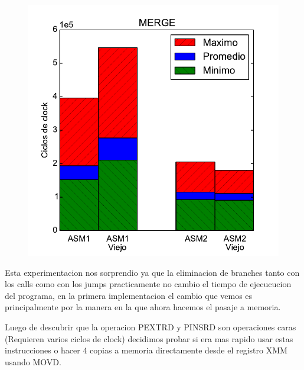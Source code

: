 \begin{figure}[h!]
	\centering
	\includegraphics[scale=0.45]{images/merge_comparationOLD}
\end{figure}

Esta experimentacion nos sorprendio ya que la eliminacion de branches tanto con los calls como con los jumps practicamente no cambio el tiempo de ejecucucion del programa, en la primera implementacion el cambio que vemos es principalmente por la manera en la que ahora hacemos el pasaje a memoria.

Luego de descubrir que la operacion PEXTRD y PINSRD son operaciones caras (Requieren varios ciclos de clock) decidimos probar si era mas rapido usar estas instrucciones o hacer 4 copias a memoria directamente desde el registro XMM usando MOVD.

